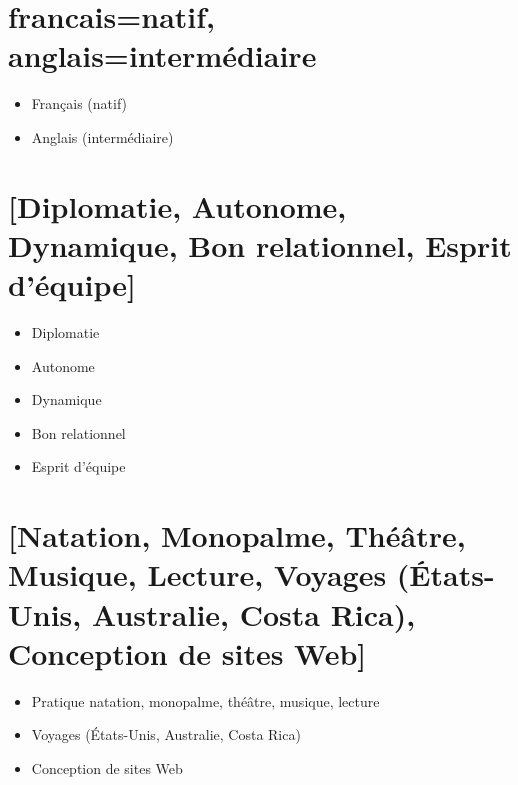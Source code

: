 \documentclass[10pt,a4paper]{article}
\newcommand{\myvspace}{\vspace{0.3cm}}
\newcommand{\myvspaceSection}{\vspace{0.7cm}}
\begin{document}
\begin{minipage}[t]{0.30\textwidth}
{\begin{minipage}{\textwidth}
    \section*{{francais=natif, anglais=intermédiaire}}
    \begin{itemize}[nosep, leftmargin=*, itemsep=0pt, parsep=0pt]
        \item Français (natif)
        \item Anglais (intermédiaire)
    \end{itemize}
    \myvspaceSection
    \section*{[Diplomatie, Autonome, Dynamique, Bon relationnel, Esprit d’équipe]}
    \begin{itemize}[nosep, leftmargin=*, itemsep=0pt, parsep=0pt]
        \item Diplomatie
        \item Autonome
        \item Dynamique
        \item Bon relationnel
        \item Esprit d’équipe
    \end{itemize}
    \myvspaceSection
    \section*{[Natation, Monopalme, Théâtre, Musique, Lecture, Voyages (États-Unis, Australie, Costa Rica), Conception de sites Web]}
    \begin{itemize}[nosep, leftmargin=*, itemsep=0pt, parsep=0pt]
        \item Pratique natation, monopalme, théâtre, musique, lecture
        \item Voyages (États-Unis, Australie, Costa Rica)
        \item Conception de sites Web
    \end{itemize}
    \myvspace
    \myvspace
    \myvspace
    \myvspace
\end{minipage}
\vspace{2cm}
}
\end{minipage}
\hfill{}
\indent
\end{document}

